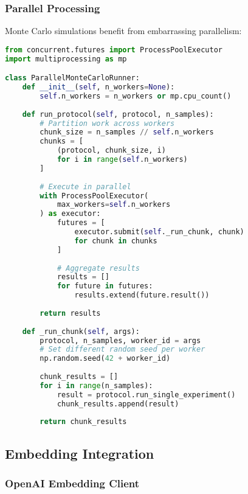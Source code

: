 \documentclass[conference]{IEEEtran}
\begin{document}
\subsubsection{Parallel Processing}

Monte Carlo simulations benefit from embarrassing parallelism:

\begin{lstlisting}[language=Python, basicstyle=\small]
from concurrent.futures import ProcessPoolExecutor
import multiprocessing as mp

class ParallelMonteCarloRunner:
    def __init__(self, n_workers=None):
        self.n_workers = n_workers or mp.cpu_count()
    
    def run_protocol(self, protocol, n_samples):
        # Partition work across workers
        chunk_size = n_samples // self.n_workers
        chunks = [
            (protocol, chunk_size, i)
            for i in range(self.n_workers)
        ]
        
        # Execute in parallel
        with ProcessPoolExecutor(
            max_workers=self.n_workers
        ) as executor:
            futures = [
                executor.submit(self._run_chunk, chunk)
                for chunk in chunks
            ]
            
            # Aggregate results
            results = []
            for future in futures:
                results.extend(future.result())
        
        return results
    
    def _run_chunk(self, args):
        protocol, n_samples, worker_id = args
        # Set different random seed per worker
        np.random.seed(42 + worker_id)
        
        chunk_results = []
        for i in range(n_samples):
            result = protocol.run_single_experiment()
            chunk_results.append(result)
        
        return chunk_results
\end{lstlisting}

\subsection{Embedding Integration}

\subsubsection{OpenAI Embedding Client}
\end{document}
